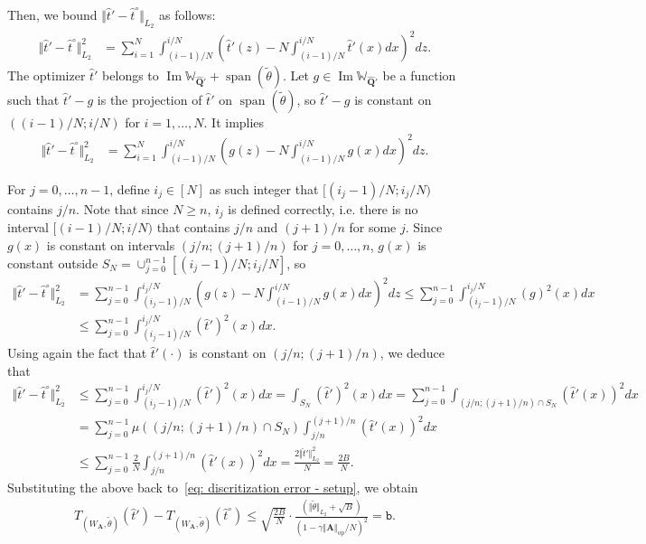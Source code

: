 \documentclass[11pt]{article}
\newcommand{\op}{\mathrm{op}}
\newcommand{\bA}{\bm{A}}
\newcommand{\bQ}{\bm{Q}}
\newcommand{\bbW}{\mathbb{W}}
\newcommand{\<}{\langle}
\renewcommand{\>}{\rangle}
\newcommand{\ttb}{\mathtt{b}}
\theoremstyle{plain}
\theoremstyle{definition}
\theoremstyle{remark}
\begin{document}
{Then, we bound $\Vert \hat{t}' - \hat{t}^\circ \Vert_{L_2}$ as follows:
\begin{align*}
    \Vert \hat{t}' - \hat{t}^\circ \Vert^2_{L_2} & = \sum_{i = 1}^N \int_{(i - 1)/N}^{i/N} \left (\hat{t}'(z) - N \int_{(i - 1)/N}^{i/N} \hat{t}'(x) dx\right )^2 dz.
\end{align*}
The optimizer $\hat{t}'$ belongs to $\operatorname{Im}{\bbW}_{\widehat{\bQ}'} + \operatorname{span}(\tilde{\theta})$. Let $g \in \operatorname{Im}{\bbW}_{\widehat{\bQ}'}$ be a function such that $\hat{t}' - g$ is the projection of $\hat{t}'$ on $\operatorname{span}(\tilde{\theta})$, so $\hat{t}' - g$ is constant on $((i - 1)/N; i/N)$ for $i = 1, \ldots, N$. It implies
\begin{align*}
    \Vert \hat{t}' - \hat{t}^\circ \Vert^2_{L_2} & = \sum_{i = 1}^N \int_{(i - 1)/N}^{i/N} \left (g(z) - N \int_{(i - 1)/N}^{i/N} g(x) dx\right )^2 dz.
\end{align*}

For $j = 0, \ldots, n - 1$, define $i_j \in [N]$ as such integer that $[(i_j - 1)/N; i_j/N)$ contains $j/n$. Note that since $N \ge n$, $i_j$ is defined correctly, i.e. there is no interval $[(i - 1)/N; i/N)$ that contains $j/n$ and $(j + 1)/n$ for some $j$. Since $g(x)$ is constant on intervals $(j/n; (j + 1)/n)$ for $j = 0, \ldots, n$, $g(x)$ is constant outside $S_{N} = \cup_{j = 0}^{n - 1} [(i_j - 1)/N; i_j/N]$, so
\begin{align*}
    \Vert \hat{t}' - \hat{t}^\circ \Vert^2_{L_2} & = \sum_{j = 0}^{n - 1} \int_{(i_j - 1)/N}^{i_j / N} \left (g(z) - N \int_{(i - 1)/N}^{i/N} g(x) dx \right )^2 dz \le  \sum_{j = 0}^{n - 1} \int_{(i_j - 1)/N}^{i_j / N}  (g)^2(x) dx \\
    & \le \sum_{j = 0}^{n - 1} \int_{(i_j - 1)/N}^{i_j / N}  (\hat{t}')^2(x) dx.
\end{align*}
Using again the fact that $\hat{t}'(\cdot)$ is constant on $(j/n; (j + 1)/n)$, we deduce that
\begin{align*}
   \Vert \hat{t}' - \hat{t}^\circ \Vert^2_{L_2} & \le \sum_{j = 0}^{n - 1} \int_{(i_j - 1)/N}^{i_j / N}  (\hat{t}')^2(x) dx  = \int_{S_N} (\hat{t}')^2(x) dx = \sum_{j = 0}^{n - 1} \int_{(j/n; (j + 1)/n) \cap S_N} (\hat{t}'(x))^2 dx \\
   & = \sum_{j = 0}^{n - 1} \mu \left ( (j/n; (j + 1)/n) \cap S_N\right )  \int_{j/n}^{(j + 1)/n} (\hat{t}'(x))^2 dx\\
    & \le \sum_{j = 0}^{n - 1} \frac{2}{N}  \int_{j/n}^{(j + 1)/n} (\hat{t}'(x))^2 dx = \frac{2 \Vert \hat{t}' \Vert_{L_2}^2}{N} = \frac{2 B}{N}.
\end{align*}
Substituting the above back to~\eqref{eq: discritization error - setup}, we obtain
\begin{align}
\label{eq: discritezation bound - final}
    T_{(W_{\bA}, \tilde{\theta})}(\hat{t}') - T_{(W_{\bA}, \tilde{\theta})}(\hat{t}^\circ) \le \sqrt{\frac{2B}{N}} \cdot \frac{(\Vert \tilde{\theta} \Vert_{L_2} + \sqrt{B})}{(1 - \gamma \Vert \bA \Vert_{\op} / N)^2} = \ttb.
\end{align}

}
\end{document}
